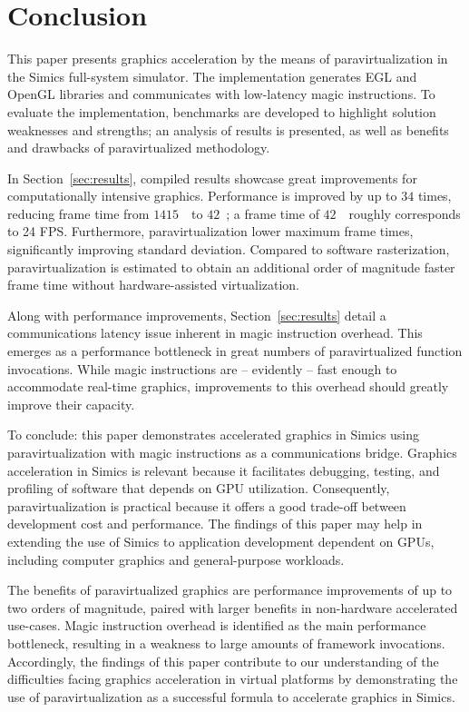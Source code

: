 \section{Conclusion}
\label{sec:conclusion}
This paper presents graphics acceleration by the means of paravirtualization in the Simics full-system simulator.
The implementation generates EGL and OpenGL libraries and communicates with low-latency magic instructions.
To evaluate the implementation, benchmarks are developed to highlight solution weaknesses and strengths; an analysis of results is presented, as well as benefits and drawbacks of paravirtualized methodology.

In Section~\ref{sec:results}, compiled results showcase great improvements for computationally intensive graphics.
Performance is improved by up to $34$ times, reducing frame time from $1415$~\milli\second\ to $42$~\milli\second ; a frame time of $42$~\milli\second\ roughly corresponds to 24 FPS.
Furthermore, paravirtualization lower maximum frame times, significantly improving standard deviation.
Compared to software rasterization, paravirtualization is estimated to obtain an additional order of magnitude faster frame time without hardware-assisted virtualization.

Along with performance improvements, Section~\ref{sec:results} detail a communications latency issue inherent in magic instruction overhead.
This emerges as a performance bottleneck in great numbers of paravirtualized function invocations.
While magic instructions are -- evidently -- fast enough to accommodate real-time graphics, improvements to this overhead should greatly improve their capacity.

To conclude: this paper demonstrates accelerated graphics in Simics using paravirtualization with magic instructions as a communications bridge.
Graphics acceleration in Simics is relevant because it facilitates debugging, testing, and profiling of software that depends on GPU utilization.
Consequently, paravirtualization is practical because it offers a good trade-off between development cost and performance.
The findings of this paper may help in extending the use of Simics to application development dependent on GPUs, including computer graphics and general-purpose workloads.

The benefits of paravirtualized graphics are performance improvements of up to two orders of magnitude, paired with larger benefits in non-hardware accelerated use-cases.
Magic instruction overhead is identified as the main performance bottleneck, resulting in a weakness to large amounts of framework invocations.
Accordingly, the findings of this paper contribute to our understanding of the difficulties facing graphics acceleration in virtual platforms by demonstrating the use of paravirtualization as a successful formula to accelerate graphics in Simics.
